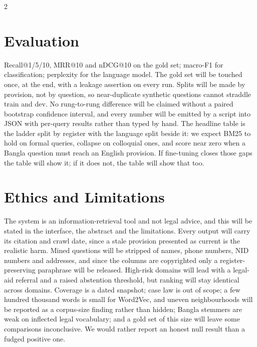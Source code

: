 \documentclass[11pt]{article}
\begin{document}
\begin{multicols}{2}
\section{Evaluation}
Recall@1/5/10, MRR@10 and nDCG@10 on the gold set; macro-F1 for classification; perplexity for the language model. The gold set will be touched once, at the end, with a leakage assertion on every run. Splits will be made by provision, not by question, so near-duplicate synthetic questions cannot straddle train and dev. No rung-to-rung difference will be claimed without a paired bootstrap confidence interval, and every number will be emitted by a script into JSON with per-query results rather than typed by hand. The headline table is the ladder split by register with the language split beside it: we expect BM25 to hold on formal queries, collapse on colloquial ones, and score near zero when a Bangla question must reach an English provision. If fine-tuning closes those gaps the table will show it; if it does not, the table will show that too.

\section{Ethics and Limitations}
The system is an information-retrieval tool and not legal advice, and this will be stated in the interface, the abstract and the limitations. Every output will carry its citation and crawl date, since a stale provision presented as current is the realistic harm. Mined questions will be stripped of names, phone numbers, NID numbers and addresses, and since the columns are copyrighted only a register-preserving paraphrase will be released. High-risk domains will lead with a legal-aid referral and a raised abstention threshold, but ranking will stay identical across domains. Coverage is a dated snapshot; case law is out of scope; a few hundred thousand words is small for Word2Vec, and uneven neighbourhoods will be reported as a corpus-size finding rather than hidden; Bangla stemmers are weak on inflected legal vocabulary; and a gold set of this size will leave some comparisons inconclusive. We would rather report an honest null result than a fudged positive one.

\end{multicols}
\end{document}
